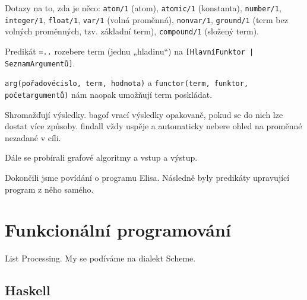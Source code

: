 \documentclass[12pt]{article}					%
\begin{document}
\begin{definice}
	Dotazy na to, zda je něco: \verb|atom/1| (atom), \verb|atomic/1| (konstanta), \verb|number/1|, \verb|integer/1|, \verb|float/1|, \verb|var/1| (volná proměnná), \verb|nonvar/1|, \verb|ground/1| (term bez volných proměnných, tzv. základní term), \verb|compound/1| (složený term).
\end{definice}

\begin{definice}[univ]
	Predikát \verb|=..| rozebere term (jednu „hladinu“) na \verb![HlavníFunktor | SeznamArgumentů]!.
\end{definice}

\begin{definice}
	\verb|arg(pořadovécislo, term, hodnota)| a \verb|functor(term, funktor, početargumentů)| nám naopak umožňují term poskládat.
\end{definice}

\begin{definice}
	Shromažďují výsledky. bagof vrací výsledky opakovaně, pokud se do nich lze dostat více způsoby. findall vždy uspěje a automaticky nebere ohled na proměnné nezadané v cíli.
\end{definice}


Dále se probírali grafové algoritmy a vstup a výstup.


Dokončili jsme povídání o programu Elisa. Následně byly predikáty upravující program z něho samého.

\section{Funkcionální programování}
\begin{definice}[LISP]
	List Processing. My se podíváme na dialekt Scheme.
\end{definice}

\subsection{Haskell}
	
\end{document}
